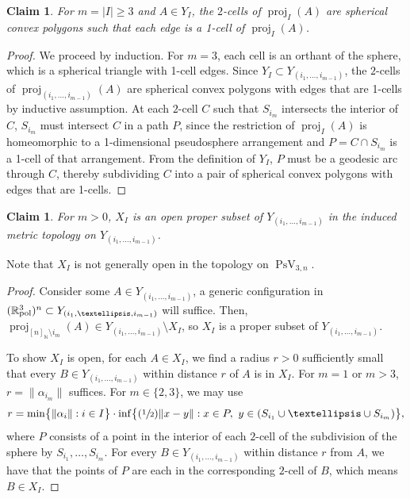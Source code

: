 \documentclass[11pt]{article}
\numberwithin{equation}{section}
\let\nicefrac\sfrac
\newtheorem{claim}[theorem]{Claim}
\theoremstyle{remark}
\let\mb\mathbb
\DeclareMathOperator{\pstief}{PsV}
\newcommand{\Rpol}[1]{\mb{R}\mathrlap{{}^{#1}}{}_\text{pol}}
\DeclareMathOperator{\proj}{proj}
\begin{document}
\begin{claim}\label{claim-sphericonvex}
For $m = |I| \geq 3$ and $A \in Y_I$, the $2$-cells of $\proj_I({A})$ are spherical convex polygons such that each edge is a 1-cell of $\proj_I({A})$.
\end{claim}

\begin{proof}
We proceed by induction. For $m=3$, each cell is an orthant of the sphere, which is a spherical triangle with 1-cell edges. Since $Y_I \subset Y_{(i_1,\dots,i_{m-1})}$, the $2$-cells of $\proj_{(i_1,\dots,i_{m-1})}(A)$ are spherical convex polygons with edges that are 1-cells by inductive assumption. At each $2$-cell $C$ such that $S_{i_m}$ intersects the interior of $C$, $S_{i_m}$ must intersect $C$ in a path $P$, since the restriction of $\proj_I({A})$ is homeomorphic to a 1-dimensional pseudosphere arrangement and $P = C \cap S_{i_m}$ is a 1-cell of that arrangement.
From the definition of $Y_I$, $P$ must be a geodesic arc through $C$, thereby subdividing $C$ into a pair of spherical convex polygons with edges that are 1-cells.
\end{proof}

\begin{claim}\label{claim-open-X}
For $m > 0$, $X_I$ is an open proper subset of $Y_{(i_1,\dots,i_{m-1})}$ in the induced metric topology on $Y_{(i_1,\dots,i_{m-1})}$.
\end{claim}

Note that $X_I$ is not generally open in the topology on $\pstief_{3,n}$.

\begin{proof}
Consider some $A \in Y_{(i_1,\dots,i_{m-1})}$, a generic configuration in $(\Rpol{3})^n \subset Y_{(i_1,\dots,i_{m-1})}$ will suffice. Then, $\proj_{[n]_\mb{N}\setminus i_m}(A) \in Y_{(i_1,\dots,i_{m-1})} \setminus X_I$, so $X_I$ is a proper subset of $Y_{(i_1,\dots,i_{m-1})}$.

To show $X_I$ is open, for each $A \in X_I$, we find a radius $r>0$ sufficiently small that every $B \in Y_{(i_1,\dots,i_{m-1})}$ within distance $r$ of $A$ is in $X_I$.
For $m =1$ or $m>3$, $r = \|\alpha_{i_m}\|$ suffices.
For $m \in \{2,3\}$, we may use
\[ r = \min \bigl\{\|\alpha_i\|:i\in I \bigr\} \cdot \inf\bigl\{ (\nicefrac{1}{2}) \|x -y\|:x \in P,\ y \in (S_{i_1} \cup \dots \cup S_{i_m}) \bigr\}, \]
where $P$ consists of a point in the interior of each $2$-cell of the subdivision of the sphere by $S_{i_1},\dots,S_{i_m}$.
For every $B \in Y_{(i_1,\dots,i_{m-1})}$ within distance $r$ from $A$, we have that the points of $P$ are each in the corresponding $2$-cell of $B$, which means $B \in X_I$.
\end{proof}
\end{document}
